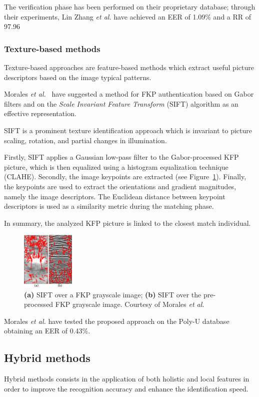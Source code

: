 \documentclass[journal]{IEEEtran}
\begin{document}
The verification phase has been performed on their proprietary database; through their experiments, Lin Zhang \textit{et al.} have achieved an EER of 1.09\% and a RR of 97.96%

\subsubsection{Texture-based methods}
Texture-based approaches are feature-based methods which extract useful picture descriptors based on the image typical patterns.

Morales \textit{et al.}~\cite{morales2011improved} have suggested a method for FKP authentication based on Gabor filters and on the \emph{Scale Invariant Feature Transform} (SIFT) algorithm as an effective representation.

SIFT is a prominent texture identification approach which is invariant to picture scaling, rotation, and partial changes in illumination. 

Firstly, SIFT applies a Gaussian low-pass filter to the Gabor-processed KFP picture, which is then equalized using a histogram equalization technique (CLAHE). Secondly, the image keypoints are extracted (see Figure~\ref{fig:sift_descriptors}). Finally, the keypoints are used to extract the orientations and gradient magnitudes, namely the image descriptors. The Euclidean distance between keypoint descriptors is used as a similarity metric during the matching phase.

In summary, the analyzed KFP picture is linked to the closest match individual.
\begin{figure}
    \centering
    \includegraphics[width=1in]{images/sift.png}
    \caption{\textbf{(a)} SIFT over a FKP grayscale image; \textbf{(b)} SIFT over the pre-processed FKP grayscale image. Courtesy of Morales \textit{et al.}}
    \label{fig:sift_descriptors}
\end{figure}

Morales \textit{et al.} have tested the proposed approach on the Poly-U database~\cite{polyu1} obtaining an EER of 0.43\%.

\subsection{Hybrid methods}
Hybrid methods consists in the application of both holistic and local features in order to improve the recognition accuracy and enhance the identification speed.
\end{document}
